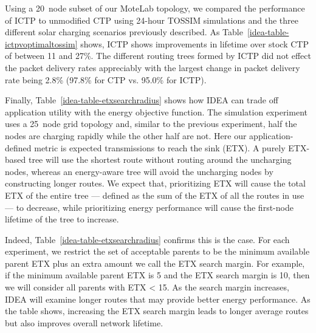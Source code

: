 Using a 20~node subset of our MoteLab topology, we compared the performance
of ICTP to unmodified CTP using 24-hour TOSSIM simulations and the three
different solar charging scenarios previously described. As
Table~\ref{idea-table-ictpvoptimaltossim} shows, ICTP shows improvements in
lifetime over stock CTP of between 11 and 27\%. The different routing trees
formed by ICTP did not effect the packet delivery rates appreciably with the
largest change in packet delivery rate being 2.8\% (97.8\% for CTP vs. 95.0\%
for ICTP).

Finally, Table~\ref{idea-table-etxsearchradius} shows how IDEA can trade off
application utility with the energy objective function. The simulation
experiment uses a 25~node grid topology and, similar to the previous
experiment, half the nodes are charging rapidly while the other half are not.
Here our application-defined metric is expected transmissions to reach the
sink (ETX). A purely ETX-based tree will use the shortest route without
routing around the uncharging nodes, whereas an energy-aware tree will avoid
the uncharging nodes by constructing longer routes. We expect that,
prioritizing ETX will cause the total ETX of the entire tree --- defined as
the sum of the ETX of all the routes in use --- to decrease, while
prioritizing energy performance will cause the first-node lifetime of the
tree to increase.

Indeed, Table~\ref{idea-table-etxsearchradius} confirms this is the case. For
each experiment, we restrict the set of acceptable parents to be the minimum
available parent ETX plus an extra amount we call the ETX search margin. For
example, if the minimum available parent ETX is 5 and the ETX search margin
is 10, then we will consider all parents with ETX < 15. As the search margin
increases, IDEA will examine longer routes that may provide better energy
performance. As the table shows, increasing the ETX search margin leads to
longer average routes but also improves overall network lifetime.

